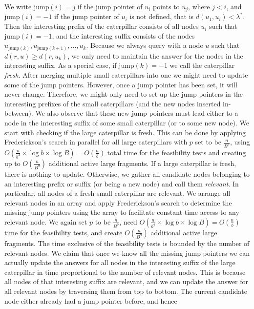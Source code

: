 \documentclass[11pt,a4paper]{article}
\newcommand{\jump}{\text{jump}}
\theoremstyle{definition}
\theoremstyle{remark}
\begin{document}
We write $\jump(i)=j$ if the jump pointer of $u_{i}$ points to $u_{j}$, where $j<i$, and $\jump(i)=-1$
if the jump pointer of $u_{i}$ is not defined, that is $d(u_{1},u_{i})<\lambda^{*}$.
Then the interesting prefix of the caterpillar consists of all nodes $u_{i}$ such that $\jump(i)=-1$,
and the interesting suffix consists of the nodes $u_{\jump(k)},u_{\jump(k+1)},\ldots,u_{k}$.
Because we always query with a node $u$ such that $d(r,u) \geq d(r,u_{k})$, we only
need to maintain the answer for the nodes in the interesting suffix. As a special case,
if $\jump(k)=-1$ we call the caterpillar \emph{fresh}.
After merging multiple small caterpillars into one we might need to update some of the jump pointers.
However, once a jump pointer has been set, it will never change. Therefore, we might only
need to set up the jump pointers in the interesting prefixes of the small caterpillars
(and the new nodes inserted in-between). We also observe that these new jump pointers
must lead either to a node in the interesting suffix of some small caterpillar
(or to some new node). We start with checking if the large caterpillar is fresh. This can be
done by applying Frederickson's search in parallel for all large caterpillars with $p$ set to
be $\frac{n}{B^{9}}$, using $O(\frac{n}{b^{4}}\times \log b \times \log B)=O(\frac{n}{b})$
total time for the feasibility tests and creating up to $O(\frac{n}{B^{9}})$ additional active large
fragments. If a large caterpillar is fresh, there is nothing to update. Otherwise,
we gather all candidate nodes belonging to
an interesting prefix or suffix (or being a new node) and call them \emph{relevant}. In particular,
all nodes of a fresh small caterpillar are relevant.
We arrange all relevant nodes in an array and apply Frederickson's search to determine the missing jump
pointers using the array to facilitate constant time access to any relevant node. We again
set $p$ to be $\frac{n}{B^{9}}$, need $O(\frac{n}{b^{4}}\times \log b \times \log B)=O(\frac{n}{b})$
time for the feasibility tests, and create $O(\frac{n}{B^{9}})$ additional active large fragments.
The time exclusive of the feasibility tests is bounded by the number of relevant nodes.
We claim that once we know all the missing jump pointers we can actually update the answers
for all nodes in the interesting suffix of the large caterpillar in time proportional to the
number of relevant nodes. This is because all nodes of that interesting suffix are
relevant, and we can update the answer for all relevant nodes by traversing them from top
to bottom. The current candidate node either already had a jump pointer before, and hence
\end{document}
